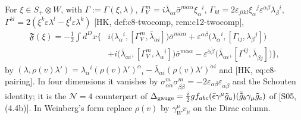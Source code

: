 \begin{remark}
For $\xi\in S_+\otimes W$, with $\Gamma:=\Gamma(\xi,\lambda)$, $\Gamma^m_V=i\bar\lambda_{\dot\alpha i}\bar\sigma^{m\dot\alpha\alpha}\xi_\alpha{}^i$, $\Gamma_{kl}=2\varepsilon_{jikl}\xi_\alpha{}^j\varepsilon^{\alpha\beta}\lambda_\beta{}^i$, $\Gamma^{kl}=2(\xi^k\varepsilon\lambda^l-\xi^l\varepsilon\lambda^k)$ [HK, def:c8-twocomp, rem:c12-twocomp],
\[
\begin{aligned}
\mathfrak F(\xi)=-\tfrac12\int d^Dx\Big\{&i\big(\lambda_\alpha{}^i,[\Gamma^m_V,\bar\lambda_{\dot\alpha i}]\big)\bar\sigma^{m\dot\alpha\alpha}+\varepsilon^{\alpha\beta}\big(\lambda_\alpha{}^i,[\Gamma_{ij},\lambda_\beta{}^j]\big)\\
&+i\big(\bar\lambda_{\dot\alpha i},[\Gamma^m_V,\lambda_\alpha{}^i]\big)\bar\sigma^{m\dot\alpha\alpha}-\varepsilon^{\dot\alpha\dot\beta}\big(\bar\lambda_{\dot\alpha i},[\Gamma^{ij},\bar\lambda_{\dot\beta j}]\big)\Big\},
\end{aligned}
\]
by $(\lambda,\rho(v)\lambda')=\lambda_\alpha{}^i(\rho(v)\lambda')^\alpha{}_i-\bar\lambda_{\dot\alpha i}(\rho(v)\lambda')^{\dot\alpha i}$ and [HK, eq:c8-pairing]. In four dimensions it vanishes by $\sigma^m_{\alpha\dot\alpha}\sigma^m_{\beta\dot\beta}=-2\varepsilon_{\alpha\beta}\varepsilon_{\dot\alpha\dot\beta}$ and the Schouten identity; it is the $\mathcal N=4$ counterpart of $\Delta_{\rm gauge}=\frac i2gf_{abc}(\bar\epsilon\gamma^\mu\tilde g_a)(\bar{\tilde g}_b\gamma_\mu\tilde g_c)$ of [S05, (4.4b)]. In Weinberg's form replace $\rho(v)$ by $\gamma_W^\mu v_\mu$ on the Dirac column.
\end{remark}

